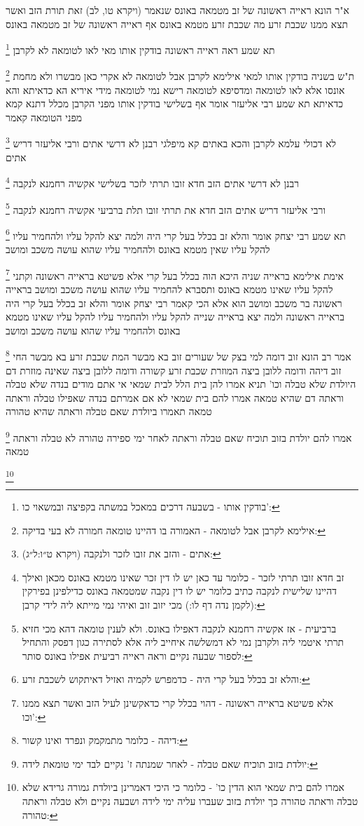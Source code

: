 \documentclass[12pt, openany]{book}
\newcommand{\footnotecomment}[1]{
	\renewcommand\thefootnote{}
	\footnote{#1}}
\newcommand{\commenta}[1]{\footnotecomment{#1}}
\begin{document}
{{א"ר הונא ראייה ראשונה של זב מטמאה באונס שנאמר (ויקרא טו, לב) זאת תורת הזב ואשר תצא ממנו שכבת זרע מה שכבת זרע מטמא באונס אף ראייה ראשונה של זב מטמאה באונס 
\commenta{בודקין אותו - בשבעה דרכים במאכל במשתה בקפיצה ובמשאוי כו':}
תא שמע ראה ראייה ראשונה בודקין אותו מאי לאו לטומאה לא לקרבן 
\commenta{אילימא לקרבן אבל לטומאה - האמורה בו דהיינו טומאה חמורה לא בעי בדיקה:}
ת"ש בשניה בודקין אותו למאי אילימא לקרבן אבל לטומאה לא אקרי כאן מבשרו ולא מחמת אונסו אלא לאו לטומאה ומדסיפא לטומאה רישא נמי לטומאה 
מידי איריא הא כדאיתא והא כדאיתא 
תא שמע רבי אליעזר אומר אף בשלישי בודקין אותו מפני הקרבן מכלל דתנא קמא מפני הטומאה קאמר 
\commenta{אתים - והזב את זובו לזכר ולנקבה (ויקרא ט״ו:ל״ג):}
לא דכולי עלמא לקרבן והכא באתים קא מיפלגי רבנן לא דרשי אתים ורבי אליעזר דריש אתים 
\commenta{זב חדא זובו תרתי לזכר - כלומר עד כאן יש לו דין זכר שאינו מטמא באונס מכאן ואילך דהיינו שלישית לנקבה כתיב כלומר יש לו דין נקבה שמטמאה באונס כדילפינן בפירקין (לקמן נדה דף לו:) מכי יזוב זוב ואיהי נמי מייתא ליה לידי קרבן:}
רבנן לא דרשי אתים הזב חדא זובו תרתי לזכר בשלישי אקשיה רחמנא לנקבה 
\commenta{ברביעית - אז אקשיה רחמנא לנקבה דאפילו באונס. ולא לענין טומאה דהא מכי חזיא תרתי איטמי ליה ולקרבן נמי לא דמשלשה איחייב ליה אלא לסתירה כגון דפסק והתחיל לספור שבעה נקיים וראה ראייה רביעית אפילו באונס סותר:}
ורבי אליעזר דריש אתים הזב חדא את תרתי זובו תלת ברביעי אקשיה רחמנא לנקבה 
\commenta{והלא זב בכלל בעל קרי היה - כדמפרש לקמיה ואזיל דאיתקוש לשכבת זרע:}
תא שמע רבי יצחק אומר והלא זב בכלל בעל קרי היה ולמה יצא להקל עליו ולהחמיר עליו להקל עליו שאין מטמא באונס ולהחמיר עליו
שהוא עושה משכב ומושב 
\commenta{אלא פשיטא בראייה ראשונה - דהוי בכלל קרי כדאקשינן לעיל הזב ואשר תצא ממנו וכו':}
אימת אילימא בראייה שניה היכא הוה בכלל בעל קרי אלא פשיטא בראייה ראשונה וקתני להקל עליו שאינו מטמא באונס 
ותסברא להחמיר עליו שהוא עושה משכב ומושב בראייה ראשונה בר משכב ומושב הוא 
אלא הכי קאמר רבי יצחק אומר והלא זב בכלל בעל קרי היה בראייה ראשונה ולמה יצא בראייה שנייה להקל עליו ולהחמיר עליו להקל עליו שאינו מטמא באונס ולהחמיר עליו שהוא עושה משכב ומושב 
\commenta{דיהה - כלומר מתמקמק ונפרד ואינו קשור:}
אמר רב הונא זוב דומה למי בצק של שעורים זוב בא מבשר המת שכבת זרע בא מבשר החי זוב דיהה ודומה ללובן ביצה המוזרת שכבת זרע קשורה ודומה ללובן ביצה שאינה מוזרת
דם היולדת שלא טבלה וכו'
תניא אמרו להן בית הלל לבית שמאי אי אתם מודים בנדה שלא טבלה וראתה דם שהיא טמאה אמרו להם בית שמאי לא אם אמרתם בנדה שאפילו טבלה וראתה טמאה תאמרו ביולדת שאם טבלה וראתה שהיא טהורה 
\commenta{יולדת בזוב תוכיח שאם טבלה - לאחר שמנתה ז' נקיים לבד ימי טומאת לידה:}
אמרו להם יולדת בזוב תוכיח שאם טבלה וראתה לאחר ימי ספירה טהורה לא טבלה וראתה טמאה 
\commenta{אמרו להם בית שמאי הוא הדין כו' - כלומר כי היכי דאמרינן ביולדת גמורה גרידא שלא טבלה וראתה טהורה כך יולדת בזוב שעברו עליה ימי לידה ושבעה נקיים ולא טבלה וראתה טהורה:}
}}
\end{document}

